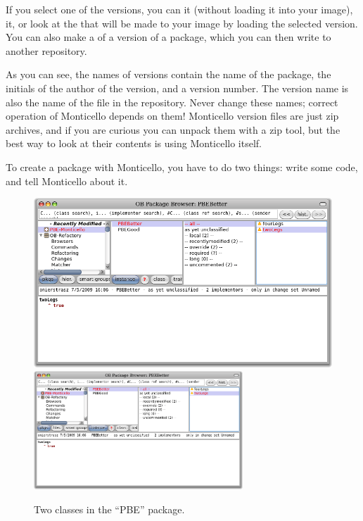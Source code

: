 \documentclass[a4paper,10pt,twoside]{book}
\begin{document}
If you select one of the versions, you can  it (without loading it into your image),  it, or look at the  that will be made to your image by loading the selected version.  You can also make a  of a version of a package, which you can then write to another repository.

As you can see, the names of versions contain the name of the package, the initials of the author of the version, and a version number.  The version name is also the name of the file in the repository.  Never change these names; correct operation of Monticello depends on them!   Monticello version files are just zip archives, and if you are curious you can unpack them with a zip tool, but the best way to look at their contents is using Monticello itself.  

To create a package with Monticello, you have to do two things: write some code, and tell Monticello about it.


\begin{figure}[btp]
	\begin{center}
	\ifluluelse
		{\includegraphics[width=\textwidth]{MCnewcategory}}
		{\includegraphics[width=0.7\textwidth]{MCnewcategory}}
	\end{center}
	\caption{Two classes in the ``PBE'' package.}
\end{figure}
\end{document}
